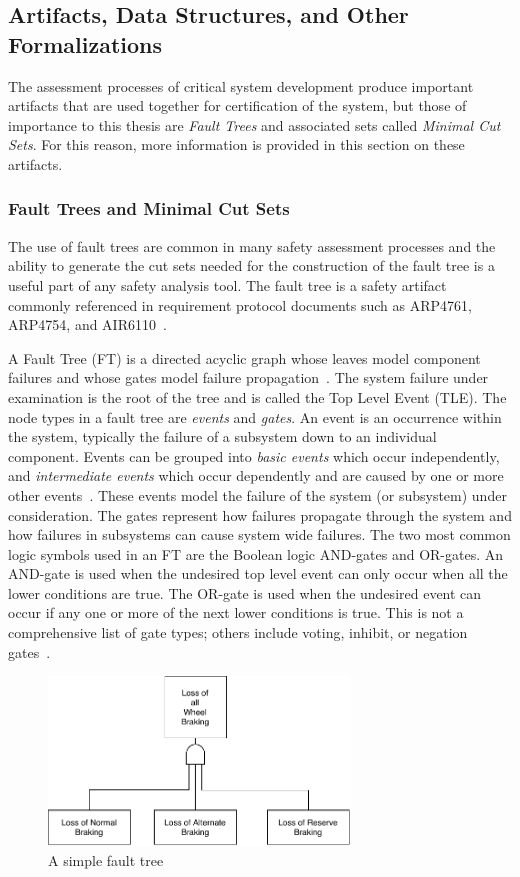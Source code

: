 \subsection{Artifacts, Data Structures, and Other Formalizations}
\label{chap:artifacts}
The assessment processes of critical system development produce important artifacts that are used together for certification of the system, but those of importance to this thesis are \textit{Fault Trees} and associated sets called \textit{Minimal Cut Sets}. For this reason, more information is provided in this section on these artifacts.

\subsubsection{Fault Trees and Minimal Cut Sets}
The use of fault trees are common in many safety assessment processes and the ability to generate the cut sets needed for the construction of the fault tree is a useful part of any safety analysis tool. The fault tree is a safety artifact commonly referenced in requirement protocol documents such as ARP4761, ARP4754, and AIR6110~\cite{SAE:ARP4761,SAE:ARP4754A,AIR6110}.

A Fault Tree (FT) is a directed acyclic graph whose leaves model component failures and whose gates model failure propagation~\cite{0f356f05e72f43018211b36f97c8854a}. The system failure under examination is the root of the tree and is called the Top Level Event (TLE). The node types in a fault tree are \textit{events} and \textit{gates}. An event is an occurrence within the system, typically the failure of a subsystem down to an individual component. Events can be grouped into \textit{basic events} which occur independently, and \textit{intermediate events} which occur dependently and are caused by one or more other events~\cite{historyFTA}.  These events model the failure of the system (or subsystem) under consideration. The gates represent how failures propagate through the system and how failures in subsystems can cause system wide failures. The two most common logic symbols used in an FT are the Boolean logic AND-gates and OR-gates. An AND-gate is used when the undesired top level event can only occur when all the lower conditions are true. The OR-gate is used when the undesired event can occur if any one or more of the next lower conditions is true. This is not a comprehensive list of gate types; others include voting, inhibit, or negation gates~\cite{0f356f05e72f43018211b36f97c8854a}.
\begin{figure}[htbp]
\begin{center}
\includegraphics[width=8cm]{images/introFT2.pdf}
\caption{A simple fault tree} \label{fig:introFT}
\end{center}
\end{figure}

